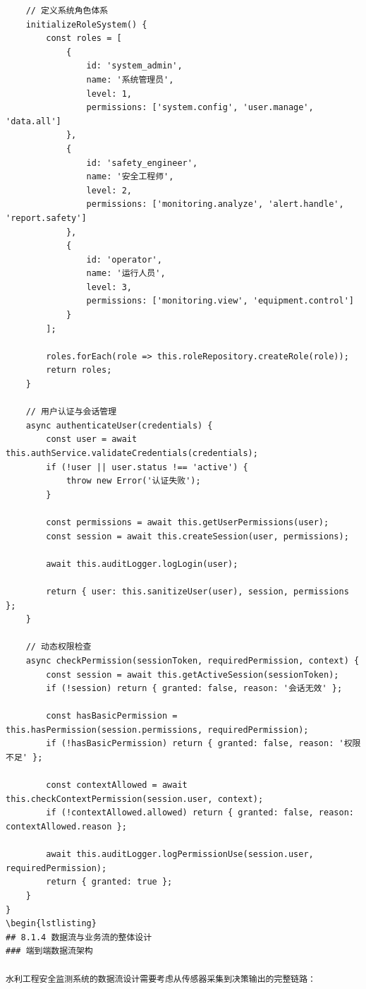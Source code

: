 \begin{verbatim}
    // 定义系统角色体系
    initializeRoleSystem() {
        const roles = [
            {
                id: 'system_admin',
                name: '系统管理员',
                level: 1,
                permissions: ['system.config', 'user.manage', 'data.all']
            },
            {
                id: 'safety_engineer', 
                name: '安全工程师',
                level: 2,
                permissions: ['monitoring.analyze', 'alert.handle', 'report.safety']
            },
            {
                id: 'operator',
                name: '运行人员',
                level: 3,
                permissions: ['monitoring.view', 'equipment.control']
            }
        ];
        
        roles.forEach(role => this.roleRepository.createRole(role));
        return roles;
    }
    
    // 用户认证与会话管理
    async authenticateUser(credentials) {
        const user = await this.authService.validateCredentials(credentials);
        if (!user || user.status !== 'active') {
            throw new Error('认证失败');
        }
        
        const permissions = await this.getUserPermissions(user);
        const session = await this.createSession(user, permissions);
        
        await this.auditLogger.logLogin(user);
        
        return { user: this.sanitizeUser(user), session, permissions };
    }
    
    // 动态权限检查
    async checkPermission(sessionToken, requiredPermission, context) {
        const session = await this.getActiveSession(sessionToken);
        if (!session) return { granted: false, reason: '会话无效' };
        
        const hasBasicPermission = this.hasPermission(session.permissions, requiredPermission);
        if (!hasBasicPermission) return { granted: false, reason: '权限不足' };
        
        const contextAllowed = await this.checkContextPermission(session.user, context);
        if (!contextAllowed.allowed) return { granted: false, reason: contextAllowed.reason };
        
        await this.auditLogger.logPermissionUse(session.user, requiredPermission);
        return { granted: true };
    }
}
\begin{lstlisting}
## 8.1.4 数据流与业务流的整体设计
### 端到端数据流架构

水利工程安全监测系统的数据流设计需要考虑从传感器采集到决策输出的完整链路：


\end{verbatim}
